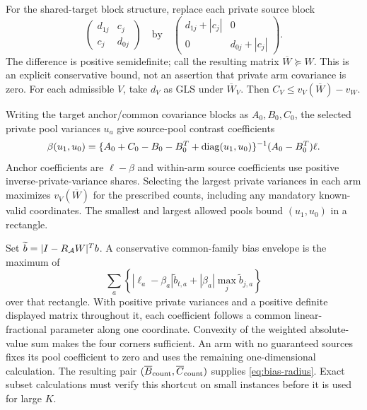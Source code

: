 For the shared-target block structure, replace each private source block
\[
 \begin{pmatrix}d_{1j}&c_j\\c_j&d_{0j}\end{pmatrix}
 \quad\text{by}\quad
 \begin{pmatrix}d_{1j}+|c_j|&0\\0&d_{0j}+|c_j|\end{pmatrix}.
\]
The difference is positive semidefinite; call the resulting matrix
$\overline W\succeq W$. This is an explicit conservative bound, not an
assertion that private arm covariance is zero. For each admissible $V$, take
$d_V$ as GLS under $\overline W_V$. Then
$C_V\le v_V(\overline W)-v_W$.

Writing the target anchor/common covariance blocks as $A_0,B_0,C_0$, the
selected private pool variances $u_a$ give source-pool contrast coefficients
\[
 \beta(u_1,u_0)=\{A_0+C_0-B_0-B_0^T+\operatorname{diag}(u_1,u_0)\}^{-1}
                    (A_0-B_0^T)\ell.
\]
Anchor coefficients are $\ell-\beta$ and within-arm source coefficients use
positive inverse-private-variance shares. Selecting the largest private
variances in each arm maximizes $v_V(\overline W)$ for the prescribed counts,
including any mandatory known-valid coordinates. The smallest and largest
allowed pools bound $(u_1,u_0)$ in a rectangle.

Set $\widetilde b=|I-R_{\mathcal A}W|^Tb$. A conservative common-family bias envelope
is the maximum of
\[
 \sum_a\left\{|\ell_a-\beta_a|\widetilde b_{t,a}
       +|\beta_a|\max_j\widetilde b_{j,a}\right\}
\]
over that rectangle. With positive private variances and a positive definite
displayed matrix throughout it, each coefficient follows a common
linear-fractional parameter along one coordinate. Convexity of the weighted
absolute-value sum makes the four corners sufficient. An arm with no
guaranteed sources fixes its pool coefficient to zero and uses the remaining
one-dimensional calculation. The resulting pair
$(\overline B_{\rm count},\overline C_{\rm count})$ supplies
\eqref{eq:bias-radius}. Exact subset calculations must verify this shortcut on
small instances before it is used for large $K$.
